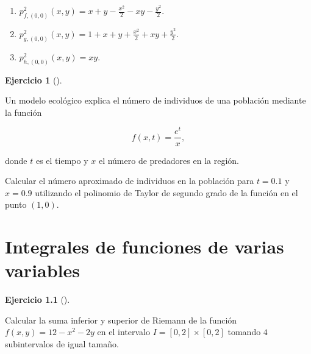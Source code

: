 \documentclass[
  a4paper,
]{scrreport}
\theoremstyle{definition}
\newtheorem{exercise}{Ejercicio}[chapter]
\theoremstyle{remark}
\begin{document}
\begin{tcolorbox}[enhanced jigsaw, rightrule=.15mm, opacityback=0, bottomtitle=1mm, titlerule=0mm, toprule=.15mm, breakable, colframe=quarto-callout-tip-color-frame, left=2mm, opacitybacktitle=0.6, title=\textcolor{quarto-callout-tip-color}{\faLightbulb}\hspace{0.5em}{Solución}, toptitle=1mm, colback=white, colbacktitle=quarto-callout-tip-color!10!white, arc=.35mm, bottomrule=.15mm, coltitle=black, leftrule=.75mm]

\begin{enumerate}
\def\labelenumi{\alph{enumi}.}
\item
  \(p^2_{f,(0,0)}(x,y) = x + y -\frac{x^2}{2} - xy -\frac{y^2}{2}\).
\item
  \(p^2_{g,(0,0)}(x,y) = 1 + x + y +\frac{x^2}{2} + xy +\frac{y^2}{2}\).
\item
  \(p^2_{h,(0,0)}(x,y) = xy\).
\end{enumerate}

\end{tcolorbox}

\begin{exercise}[]\protect\hypertarget{exr-polinomio-taylor-modelo-ecologico}{}\label{exr-polinomio-taylor-modelo-ecologico}

Un modelo ecológico explica el número de individuos de una población
mediante la función

\[f(x,t)=\dfrac{e^t}{x},\]

donde \(t\) es el tiempo y \(x\) el número de predadores en la región.

Calcular el número aproximado de individuos en la población para
\(t=0.1\) y \(x=0.9\) utilizando el polinomio de Taylor de segundo grado
de la función en el punto \((1,0)\).

\end{exercise}


\hypertarget{integrales-de-funciones-de-varias-variables}{%
\chapter{Integrales de funciones de varias
variables}\label{integrales-de-funciones-de-varias-variables}}

\begin{exercise}[]\protect\hypertarget{exr-sumas-riemann-n-dimensional}{}\label{exr-sumas-riemann-n-dimensional}

Calcular la suma inferior y superior de Riemann de la función
\(f(x,y)=12-x^2-2y\) en el intervalo \(I=[0,2]\times[0,2]\) tomando
\(4\) subintervalos de igual tamaño.

\end{exercise}
\end{document}
